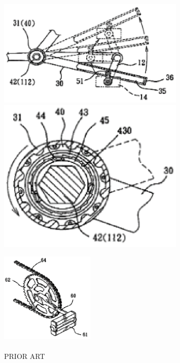 \documentclass[10pt, a4paper]{article}
\begin{document}
{		\begin{figure}[!h]
			\begin{minipage}{0.49\textwidth}
				\centering
				\includegraphics[width=0.8\textwidth]{figures/fig8.png}
				\caption{}
			\end{minipage}
			\begin{minipage}{0.49\textwidth}
				\centering
				\includegraphics[width=0.8\textwidth]{figures/fig9.png}
				\caption{}
			\end{minipage}
		\end{figure}
	
		\begin{figure}[!h]
			\centering
			\includegraphics[width=0.4\textwidth]{figures/fig10.png} 
			\caption{\\ PRIOR ART}
		\end{figure}
	}
	
\end{document}
